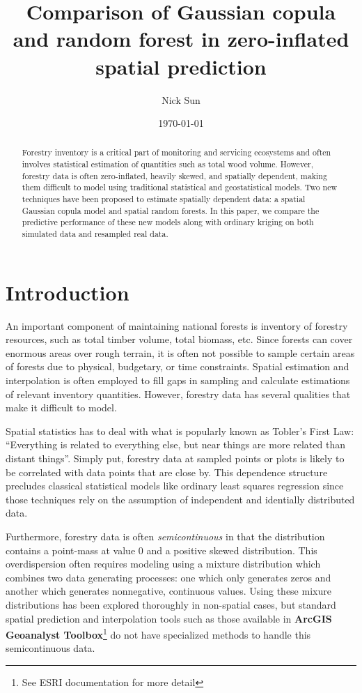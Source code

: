 \documentclass{article}
\title{Comparison of Gaussian copula and random forest in zero-inflated spatial prediction}
\date{\today}
\author{Nick Sun}
\begin{document}
\maketitle

\begin{abstract}
	Forestry inventory is a critical part of monitoring and servicing ecosystems and often involves statistical estimation of quantities such as total wood volume.
	However, forestry data is often zero-inflated, heavily skewed, and spatially dependent, making them difficult to model using traditional statistical and geostatistical models.
	Two new techniques have been proposed to estimate spatially dependent data: a spatial Gaussian copula model and spatial random forests.
	In this paper, we compare the predictive performance of these new models along with ordinary kriging on both simulated data and resampled real data.
\end{abstract}

\section{Introduction}
An important component of maintaining national forests is inventory of forestry resources, such as total timber volume, total biomass, etc.
Since forests can cover enormous areas over rough terrain, it is often not possible to sample certain areas of forests due to physical, budgetary, or time constraints.
Spatial estimation and interpolation is often employed to fill gaps in sampling and calculate estimations of relevant inventory quantities.
However, forestry data has several qualities that make it difficult to model.

Spatial statistics has to deal with what is popularly known as Tobler's First Law: ``Everything is related to everything else, but near things are more related than distant things''\cite{miller04}.
Simply put, forestry data at sampled points or plots is likely to be correlated with data points that are close by.
This dependence structure precludes classical statistical models like ordinary least squares regression since those techniques rely on the assumption of independent and identially distributed data.

Furthermore, forestry data is often \textit{semicontinuous} in that the distribution contains a point-mass at value 0 and a positive skewed distribution\cite{mills13}.
This overdispersion often requires modeling using a mixture distribution which combines two data generating processes: one which only generates zeros and another which generates nonnegative, continuous values.
Using these mixure distributions has been explored thoroughly in non-spatial cases, but standard spatial prediction and interpolation tools such as those available in \textbf{ArcGIS Geoanalyst Toolbox}\footnote{See ESRI documentation for more detail} do not have specialized methods to handle this semicontinuous data.
\end{document}
